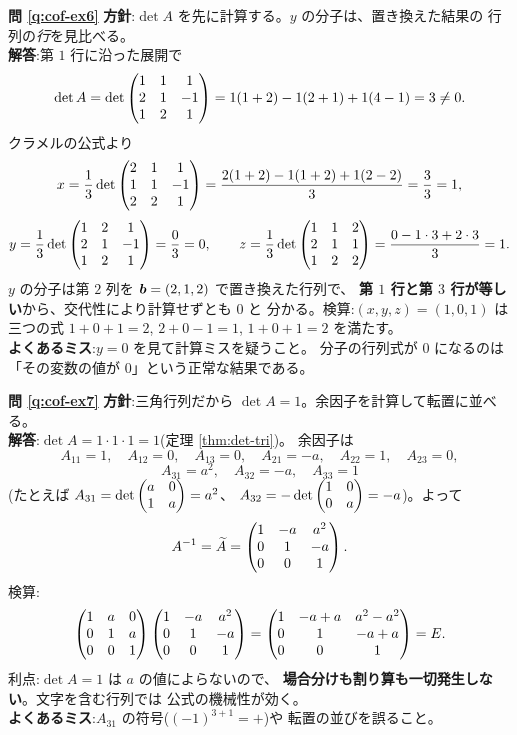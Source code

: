 \bigskip
\noindent\textbf{問 \ref{q:cof-ex6}}\quad
\textbf{方針}:$\det A$ を先に計算する。$y$ の分子は、置き換えた結果の
行列の\emph{行}を見比べる。\\
\textbf{解答}:第 $1$ 行に沿った展開で
\[
\det A = \det \begin{pmatrix}1 & 1 & 1 \\ 2 & 1 & -1 \\ 1 & 2 & 1\end{pmatrix}
= 1(1 + 2) - 1(2 + 1) + 1(4 - 1) = 3 \neq 0.
\]
クラメルの公式より
\[
x = \frac{1}{3}\det \begin{pmatrix}2 & 1 & 1 \\ 1 & 1 & -1 \\ 2 & 2 & 1\end{pmatrix}
= \frac{2(1+2) - 1(1+2) + 1(2-2)}{3} = \frac{3}{3} = 1,
\]
\[
y = \frac{1}{3}\det \begin{pmatrix}1 & 2 & 1 \\ 2 & 1 & -1 \\ 1 & 2 & 1\end{pmatrix} = \frac{0}{3} = 0,
\qquad
z = \frac{1}{3}\det \begin{pmatrix}1 & 1 & 2 \\ 2 & 1 & 1 \\ 1 & 2 & 2\end{pmatrix}
= \frac{0 - 1 \cdot 3 + 2 \cdot 3}{3} = 1.
\]
$y$ の分子は第 $2$ 列を $\bm{b} = (2, 1, 2)$ で置き換えた行列で、
\textbf{第 $1$ 行と第 $3$ 行が等しい}から、交代性により計算せずとも $0$ と
分かる。検算:$(x, y, z) = (1, 0, 1)$ は三つの式
$1 + 0 + 1 = 2$, $2 + 0 - 1 = 1$, $1 + 0 + 1 = 2$ を満たす。\\
\textbf{よくあるミス}:$y = 0$ を見て計算ミスを疑うこと。
分子の行列式が $0$ になるのは「その変数の値が $0$」という正常な結果である。

\bigskip
\noindent\textbf{問 \ref{q:cof-ex7}}\quad
\textbf{方針}:三角行列だから $\det A = 1$。余因子を計算して転置に並べる。\\
\textbf{解答}:$\det A = 1 \cdot 1 \cdot 1 = 1$(定理 \ref{thm:det-tri})。
余因子は
\[
A_{11} = 1, \quad A_{12} = 0, \quad A_{13} = 0, \quad
A_{21} = -a, \quad A_{22} = 1, \quad A_{23} = 0,
\]
\[
A_{31} = a^2, \quad A_{32} = -a, \quad A_{33} = 1
\]
(たとえば $A_{31} = \det \begin{pmatrix}a & 0 \\ 1 & a\end{pmatrix} = a^2$、
$A_{32} = -\det \begin{pmatrix}1 & 0 \\ 0 & a\end{pmatrix} = -a$)。よって
\[
A^{-1} = \widetilde{A} = \begin{pmatrix}1 & -a & a^2 \\ 0 & 1 & -a \\ 0 & 0 & 1\end{pmatrix}.
\]
検算:
\[
\begin{pmatrix}1 & a & 0 \\ 0 & 1 & a \\ 0 & 0 & 1\end{pmatrix}
\begin{pmatrix}1 & -a & a^2 \\ 0 & 1 & -a \\ 0 & 0 & 1\end{pmatrix}
= \begin{pmatrix}1 & -a + a & a^2 - a^2 \\ 0 & 1 & -a + a \\ 0 & 0 & 1\end{pmatrix} = E.
\]
利点:$\det A = 1$ は $a$ の値によらないので、
\textbf{場合分けも割り算も一切発生しない}。文字を含む行列では
公式の機械性が効く。\\
\textbf{よくあるミス}:$A_{31}$ の符号($(-1)^{3+1} = +$)や
転置の並びを誤ること。

